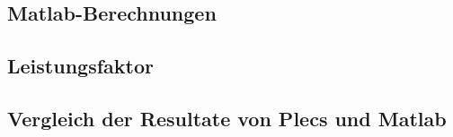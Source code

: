 \begin{appendix} %
\section{Matlab-Berechnungen}
\subsection{Leistungsfaktor}


\subsection{Vergleich der Resultate von Plecs und Matlab}

\end{appendix}
